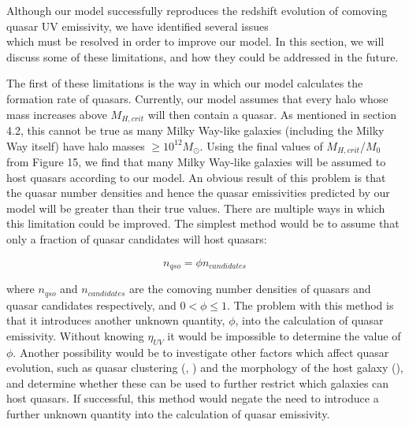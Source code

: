 \documentclass[12pt]{article}%
\begin{document}
Although our model successfully reproduces the redshift evolution of comoving quasar UV emissivity, we have identified several issues\\which must be resolved in order to improve our model. In this section, we will discuss some of these limitations, and how they could be addressed in the future.\par

The first of these limitations is the way in which our model calculates the formation rate of quasars. Currently, our model assumes that every halo whose mass increases above $M_{H,crit}$ will then contain a quasar. As mentioned in section 4.2, this cannot be true as many Milky Way-like galaxies (including the Milky Way itself) have halo masses $\geq10^{12}M_\odot$. Using the final values of $M_{H,crit}$/$M_0$ from Figure 15, we find that many Milky Way-like galaxies will be assumed to host quasars according to our model. An obvious result of this problem is that the quasar number densities and hence the quasar emissivities predicted by our model will be greater than their true values. There are multiple ways in which this limitation could be improved. The simplest method would be to assume that only a fraction of quasar candidates will host quasars:

\begin{equation}
    n_{qso}=\phi n_{candidates}
\end{equation}

\noindent where $n_{qso}$ and $n_{candidates}$ are the comoving number densities of quasars and quasar candidates respectively, and $0<\phi\leq1$. The problem with this method is that it introduces another unknown quantity, $\phi$, into the calculation of quasar emissivity. Without knowing $\eta_{UV}$ it would be impossible to determine the value of $\phi$. Another possibility would be to investigate other factors which affect quasar evolution, such as quasar clustering (\cite{Clustering_1}, \cite{Clustering_2}) and the morphology of the host galaxy (\cite{Morphology}), and determine whether these can be used to further restrict which galaxies can host quasars. If successful, this method would neg\-ate the need to introduce a further unknown quantity into the calculation of quasar emissivity.\par
\end{document}

